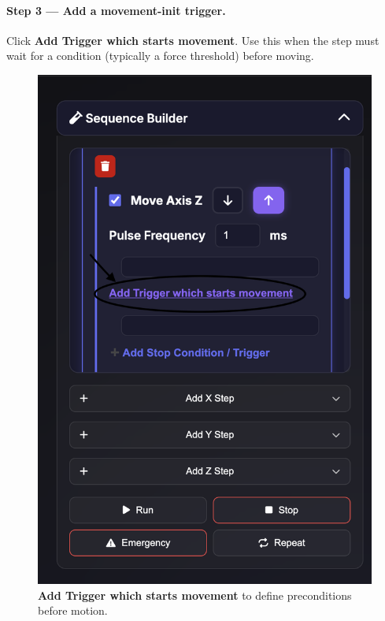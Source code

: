 \documentclass[
    twocolumn,
    fontsize = 10pt,
    parskip = half+,
    headings = small,
    headwidth = text,
    footwidth = text,
]{scrartcl}
\begin{document}
\paragraph{\textbf{Step 3 — Add a movement-init trigger.}}
Click \textbf{Add Trigger which starts movement}. Use this when the step must wait for a condition (typically a force threshold) before moving.
\begin{figure}[htbp]\centering
  \includegraphics[width=.9\linewidth]{pics/sb-2.png}
  \caption{\textbf{Add Trigger which starts movement} to define preconditions before motion.}
  \label{fig:sb-2}
\end{figure}
\end{document}
